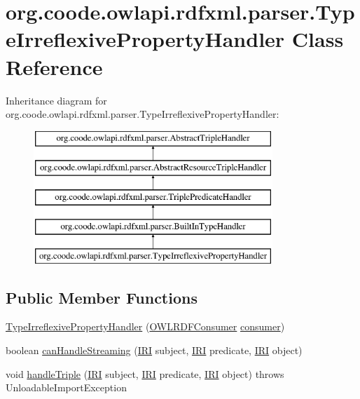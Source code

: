 \hypertarget{classorg_1_1coode_1_1owlapi_1_1rdfxml_1_1parser_1_1_type_irreflexive_property_handler}{\section{org.\-coode.\-owlapi.\-rdfxml.\-parser.\-Type\-Irreflexive\-Property\-Handler Class Reference}
\label{classorg_1_1coode_1_1owlapi_1_1rdfxml_1_1parser_1_1_type_irreflexive_property_handler}
}
Inheritance diagram for org.\-coode.\-owlapi.\-rdfxml.\-parser.\-Type\-Irreflexive\-Property\-Handler\-:\begin{figure}[H]
\begin{center}
\leavevmode
\includegraphics[height=5.000000cm]{classorg_1_1coode_1_1owlapi_1_1rdfxml_1_1parser_1_1_type_irreflexive_property_handler}
\end{center}
\end{figure}
\subsection*{Public Member Functions}
\begin{DoxyCompactItemize}
\item 
\hyperlink{classorg_1_1coode_1_1owlapi_1_1rdfxml_1_1parser_1_1_type_irreflexive_property_handler_a539ca4fde77bc406fa606adb50882ccc}{Type\-Irreflexive\-Property\-Handler} (\hyperlink{classorg_1_1coode_1_1owlapi_1_1rdfxml_1_1parser_1_1_o_w_l_r_d_f_consumer}{O\-W\-L\-R\-D\-F\-Consumer} \hyperlink{classorg_1_1coode_1_1owlapi_1_1rdfxml_1_1parser_1_1_abstract_triple_handler_a4ccf4d898ff01eb1cadfa04b23d54e9c}{consumer})
\item 
boolean \hyperlink{classorg_1_1coode_1_1owlapi_1_1rdfxml_1_1parser_1_1_type_irreflexive_property_handler_adc8324a8c950982d99959ed15af0b8df}{can\-Handle\-Streaming} (\hyperlink{classorg_1_1semanticweb_1_1owlapi_1_1model_1_1_i_r_i}{I\-R\-I} subject, \hyperlink{classorg_1_1semanticweb_1_1owlapi_1_1model_1_1_i_r_i}{I\-R\-I} predicate, \hyperlink{classorg_1_1semanticweb_1_1owlapi_1_1model_1_1_i_r_i}{I\-R\-I} object)
\item 
void \hyperlink{classorg_1_1coode_1_1owlapi_1_1rdfxml_1_1parser_1_1_type_irreflexive_property_handler_a52a42d63bad4fc08619150bff02614df}{handle\-Triple} (\hyperlink{classorg_1_1semanticweb_1_1owlapi_1_1model_1_1_i_r_i}{I\-R\-I} subject, \hyperlink{classorg_1_1semanticweb_1_1owlapi_1_1model_1_1_i_r_i}{I\-R\-I} predicate, \hyperlink{classorg_1_1semanticweb_1_1owlapi_1_1model_1_1_i_r_i}{I\-R\-I} object)  throws Unloadable\-Import\-Exception 
\end{DoxyCompactItemize}
